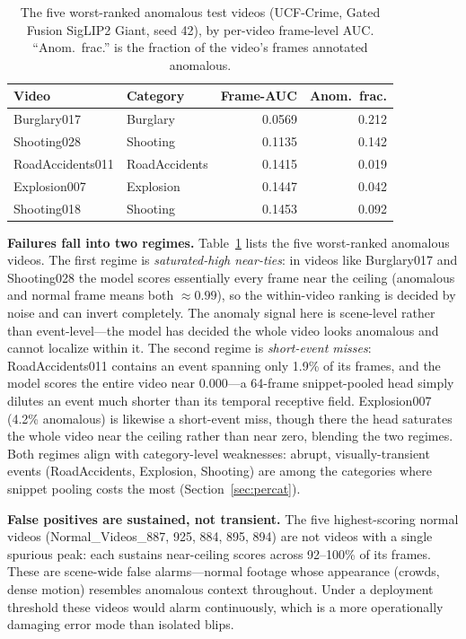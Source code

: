 \begin{table}[t]
\centering
\caption[Five worst-ranked anomalous test videos (UCF-Crime)]{The five worst-ranked anomalous test videos (UCF-Crime, Gated Fusion
SigLIP2 Giant, seed 42), by per-video frame-level AUC. ``Anom.\ frac.'' is the
fraction of the video's frames annotated anomalous.}
\label{tab:failure-cases}
\begin{tabular}{llrr}
\toprule
Video & Category & Frame-AUC & Anom.\ frac. \\
\midrule
Burglary017 & Burglary & 0.0569 & 0.212 \\
Shooting028 & Shooting & 0.1135 & 0.142 \\
RoadAccidents011 & RoadAccidents & 0.1415 & 0.019 \\
Explosion007 & Explosion & 0.1447 & 0.042 \\
Shooting018 & Shooting & 0.1453 & 0.092 \\
\bottomrule
\end{tabular}
\end{table}

\textbf{Failures fall into two regimes.} Table~\ref{tab:failure-cases} lists
the five worst-ranked anomalous videos. The first regime is
\emph{saturated-high near-ties}: in videos like Burglary017 and Shooting028
the model scores essentially every frame near the ceiling (anomalous and
normal frame means both ${\approx}0.99$), so the within-video ranking is
decided by noise and can invert completely. The anomaly signal here is
scene-level rather than event-level---the model has decided the whole video
looks anomalous and cannot localize within it. The second regime is
\emph{short-event misses}: RoadAccidents011 contains an event spanning only
1.9\% of its frames, and the model scores the entire video near 0.000---a
64-frame snippet-pooled head simply dilutes an event much shorter than its
temporal receptive field. Explosion007 (4.2\% anomalous) is likewise a
short-event miss, though there the head saturates the whole video near the
ceiling rather than near zero, blending the two regimes. Both regimes align
with category-level weaknesses: abrupt, visually-transient events
(RoadAccidents, Explosion, Shooting) are among the categories where snippet
pooling costs the most (Section~\ref{sec:percat}).

\textbf{False positives are sustained, not transient.} The five
highest-scoring normal videos (Normal\_Videos\_887, 925, 884, 895, 894) are
not videos with a single spurious peak: each sustains near-ceiling scores
across 92--100\% of its frames. These are scene-wide false alarms---normal
footage whose appearance (crowds, dense motion) resembles anomalous context
throughout. Under a deployment threshold these videos would alarm
continuously, which is a more operationally damaging error mode than isolated
blips.

